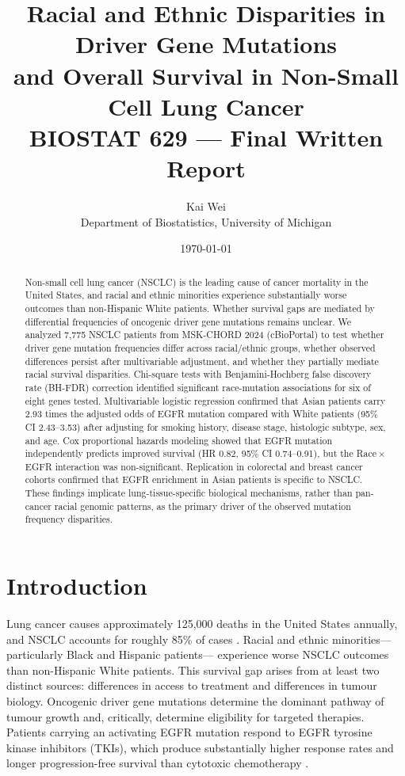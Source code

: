 \documentclass[12pt]{article}
\title{%
  \textbf{Racial and Ethnic Disparities in Driver Gene Mutations\\
  and Overall Survival in Non-Small Cell Lung Cancer}\\[0.5em]
  \large BIOSTAT 629 --- Final Written Report%
}
\author{Kai Wei \\ Department of Biostatistics, University of Michigan}
\date{\today}
\begin{document}
\maketitle
\thispagestyle{empty}

\begin{abstract}
\noindent
Non-small cell lung cancer (NSCLC) is the leading cause of cancer
mortality in the United States, and racial and ethnic minorities experience
substantially worse outcomes than non-Hispanic White patients.
Whether survival gaps are mediated by differential frequencies of oncogenic
driver gene mutations remains unclear.
We analyzed 7,775 NSCLC patients from MSK-CHORD 2024 (cBioPortal) to test
whether driver gene mutation frequencies differ across racial/ethnic groups,
whether observed differences persist after multivariable adjustment, and
whether they partially mediate racial survival disparities.
Chi-square tests with Benjamini-Hochberg false discovery rate (BH-FDR)
correction identified significant race-mutation associations for six of eight
genes tested.
Multivariable logistic regression confirmed that Asian patients carry 2.93
times the adjusted odds of EGFR mutation compared with White patients
(95\% CI 2.43--3.53) after adjusting for smoking history, disease stage,
histologic subtype, sex, and age.
Cox proportional hazards modeling showed that EGFR mutation independently
predicts improved survival (HR 0.82, 95\% CI 0.74--0.91), but the
Race\,$\times$\,EGFR interaction was non-significant.
Replication in colorectal and breast cancer cohorts confirmed that EGFR
enrichment in Asian patients is specific to NSCLC.
These findings implicate lung-tissue-specific biological mechanisms,
rather than pan-cancer racial genomic patterns, as the primary driver of the
observed mutation frequency disparities.
\end{abstract}

\newpage
\setcounter{page}{1}

\section{Introduction}

Lung cancer causes approximately 125,000 deaths in the United States annually,
and NSCLC accounts for roughly 85\% of cases \cite{Siegel2023}.
Racial and ethnic minorities---particularly Black and Hispanic patients---
experience worse NSCLC outcomes than non-Hispanic White patients.
This survival gap arises from at least two distinct sources: differences in
access to treatment and differences in tumour biology.
Oncogenic driver gene mutations determine the dominant pathway of tumour growth
and, critically, determine eligibility for targeted therapies.
Patients carrying an activating EGFR mutation respond to EGFR tyrosine kinase
inhibitors (TKIs), which produce substantially higher response rates and
longer progression-free survival than cytotoxic chemotherapy \cite{Mok2009}.
\end{document}
